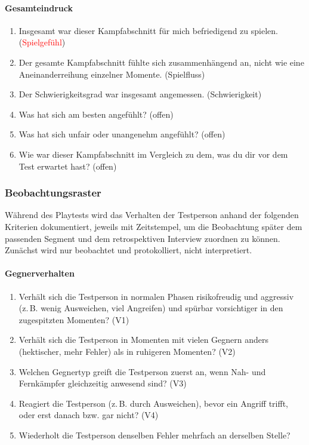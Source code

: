 \documentclass[../Main.tex]{subfiles}
\begin{document}
\paragraph{Gesamteindruck}
\begin{enumerate}[label=\textbf{Q\arabic*}, leftmargin=1.5cm, itemsep=0.5em, resume]
    \item Insgesamt war dieser Kampfabschnitt für mich befriedigend zu spielen. \hfill (\textcolor{red}{Spielgefühl})
    \item Der gesamte Kampfabschnitt fühlte sich zusammenhängend an, nicht wie eine Aneinanderreihung einzelner Momente. \hfill (Spielfluss)
    \item Der Schwierigkeitsgrad war insgesamt angemessen. \hfill (Schwierigkeit)
    \item Was hat sich am besten angefühlt? \hfill (offen)
    \item Was hat sich unfair oder unangenehm angefühlt? \hfill (offen)
    \item Wie war dieser Kampfabschnitt im Vergleich zu dem, was du dir vor dem Test erwartet hast? \hfill (offen)
\end{enumerate}

\subsubsection{Beobachtungsraster} \label{sec:Beobachtungsraster}
 
Während des Playtests wird das Verhalten der Testperson anhand der folgenden Kriterien dokumentiert, jeweils mit Zeitstempel, um die Beobachtung später dem passenden Segment und dem retrospektiven Interview zuordnen zu können. Zunächst wird nur beobachtet und protokolliert, nicht interpretiert.
 
\paragraph{Gegnerverhalten}
\begin{enumerate}[label=\textbf{B\arabic*}, leftmargin=1.5cm, itemsep=0.5em]
    \item Verhält sich die Testperson in normalen Phasen risikofreudig und aggressiv (z.\,B. wenig Ausweichen, viel Angreifen) und spürbar vorsichtiger in den zugespitzten Momenten? \hfill (V1)
    \item Verhält sich die Testperson in Momenten mit vielen Gegnern anders (hektischer, mehr Fehler) als in ruhigeren Momenten? \hfill (V2)
    \item Welchen Gegnertyp greift die Testperson zuerst an, wenn Nah- und Fernkämpfer gleichzeitig anwesend sind? \hfill (V3)
    \item Reagiert die Testperson (z.\,B. durch Ausweichen), bevor ein Angriff trifft, oder erst danach bzw. gar nicht? \hfill (V4)
    \item Wiederholt die Testperson denselben Fehler mehrfach an derselben Stelle?
\end{enumerate}
 
\end{document}
